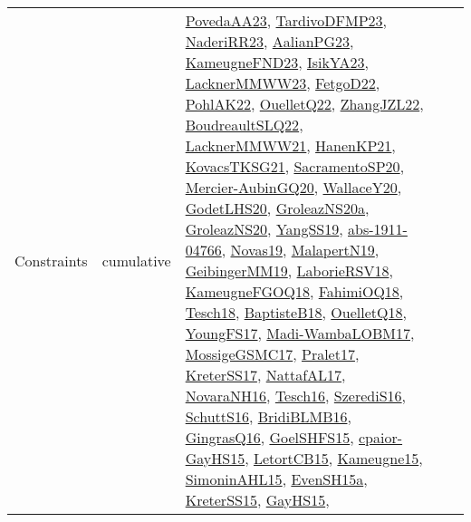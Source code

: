 {\begin{longtable}{lp{3cm}>{\raggedright}p{6cm}>{\raggedright}p{6cm}p{8cm}}
Constraints & cumulative & \href{papers/PovedaAA23.pdf}{PovedaAA23}\cite{PovedaAA23}, \href{papers/TardivoDFMP23.pdf}{TardivoDFMP23}\cite{TardivoDFMP23}, \href{articles/NaderiRR23.pdf}{NaderiRR23}\cite{NaderiRR23}, \href{papers/AalianPG23.pdf}{AalianPG23}\cite{AalianPG23}, \href{papers/KameugneFND23.pdf}{KameugneFND23}\cite{KameugneFND23}, \href{articles/IsikYA23.pdf}{IsikYA23}\cite{IsikYA23}, \href{articles/LacknerMMWW23.pdf}{LacknerMMWW23}\cite{LacknerMMWW23}, \href{articles/FetgoD22.pdf}{FetgoD22}\cite{FetgoD22}, \href{articles/PohlAK22.pdf}{PohlAK22}\cite{PohlAK22}, \href{papers/OuelletQ22.pdf}{OuelletQ22}\cite{OuelletQ22}, \href{papers/ZhangJZL22.pdf}{ZhangJZL22}\cite{ZhangJZL22}, \href{papers/BoudreaultSLQ22.pdf}{BoudreaultSLQ22}\cite{BoudreaultSLQ22}, \href{papers/LacknerMMWW21.pdf}{LacknerMMWW21}\cite{LacknerMMWW21}, \href{papers/HanenKP21.pdf}{HanenKP21}\cite{HanenKP21}, \href{papers/KovacsTKSG21.pdf}{KovacsTKSG21}\cite{KovacsTKSG21}, \href{articles/SacramentoSP20.pdf}{SacramentoSP20}\cite{SacramentoSP20}, \href{papers/Mercier-AubinGQ20.pdf}{Mercier-AubinGQ20}\cite{Mercier-AubinGQ20}, \href{articles/WallaceY20.pdf}{WallaceY20}\cite{WallaceY20}, \href{papers/GodetLHS20.pdf}{GodetLHS20}\cite{GodetLHS20}, \href{papers/GroleazNS20a.pdf}{GroleazNS20a}\cite{GroleazNS20a}, \href{papers/GroleazNS20.pdf}{GroleazNS20}\cite{GroleazNS20}, \href{papers/YangSS19.pdf}{YangSS19}\cite{YangSS19}, \href{articles/abs-1911-04766.pdf}{abs-1911-04766}\cite{abs-1911-04766}, \href{articles/Novas19.pdf}{Novas19}\cite{Novas19}, \href{papers/MalapertN19.pdf}{MalapertN19}\cite{MalapertN19}, \href{papers/GeibingerMM19.pdf}{GeibingerMM19}\cite{GeibingerMM19}, \href{articles/LaborieRSV18.pdf}{LaborieRSV18}\cite{LaborieRSV18}, \href{papers/KameugneFGOQ18.pdf}{KameugneFGOQ18}\cite{KameugneFGOQ18}, \href{articles/FahimiOQ18.pdf}{FahimiOQ18}\cite{FahimiOQ18}, \href{papers/Tesch18.pdf}{Tesch18}\cite{Tesch18}, \href{articles/BaptisteB18.pdf}{BaptisteB18}\cite{BaptisteB18}, \href{papers/OuelletQ18.pdf}{OuelletQ18}\cite{OuelletQ18}, \href{papers/YoungFS17.pdf}{YoungFS17}\cite{YoungFS17}, \href{papers/Madi-WambaLOBM17.pdf}{Madi-WambaLOBM17}\cite{Madi-WambaLOBM17}, \href{papers/MossigeGSMC17.pdf}{MossigeGSMC17}\cite{MossigeGSMC17}, \href{papers/Pralet17.pdf}{Pralet17}\cite{Pralet17}, \href{articles/KreterSS17.pdf}{KreterSS17}\cite{KreterSS17}, \href{articles/NattafAL17.pdf}{NattafAL17}\cite{NattafAL17}, \href{articles/NovaraNH16.pdf}{NovaraNH16}\cite{NovaraNH16}, \href{papers/Tesch16.pdf}{Tesch16}\cite{Tesch16}, \href{papers/SzerediS16.pdf}{SzerediS16}\cite{SzerediS16}, \href{papers/SchuttS16.pdf}{SchuttS16}\cite{SchuttS16}, \href{articles/BridiBLMB16.pdf}{BridiBLMB16}\cite{BridiBLMB16}, \href{papers/GingrasQ16.pdf}{GingrasQ16}\cite{GingrasQ16}, \href{articles/GoelSHFS15.pdf}{GoelSHFS15}\cite{GoelSHFS15}, \href{papers/cpaior-GayHS15.pdf}{cpaior-GayHS15}\cite{cpaior-GayHS15}, \href{articles/LetortCB15.pdf}{LetortCB15}\cite{LetortCB15}, \href{articles/Kameugne15.pdf}{Kameugne15}\cite{Kameugne15}, \href{articles/SimoninAHL15.pdf}{SimoninAHL15}\cite{SimoninAHL15}, \href{articles/EvenSH15a.pdf}{EvenSH15a}\cite{EvenSH15a}, \href{papers/KreterSS15.pdf}{KreterSS15}\cite{KreterSS15}, \href{papers/GayHS15.pdf}{GayHS15}\cite{GayHS15}, 
\end{longtable}}
